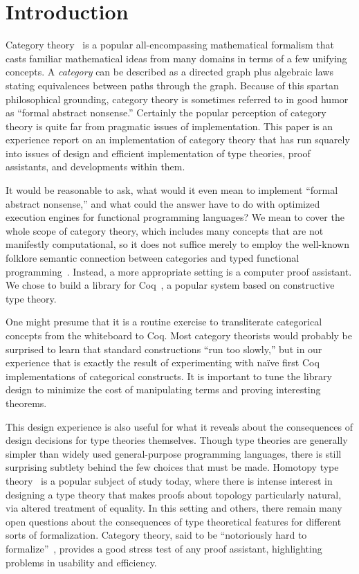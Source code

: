 \documentclass[runningheads]{llncs}
\begin{document}
\section{Introduction}

Category theory~\cite{mac1998categories} is a popular all-encompassing mathematical formalism that casts familiar mathematical ideas from many domains in terms of a few unifying concepts.  A \emph{category} can be described as a directed graph plus algebraic laws stating equivalences between paths through the graph.  Because of this spartan philosophical grounding, category theory is sometimes referred to in good humor as ``formal abstract nonsense.''  Certainly the popular perception of category theory is quite far from pragmatic issues of implementation.  This paper is an experience report on an implementation of category theory that has run squarely into issues of design and efficient implementation of type theories, proof assistants, and developments within them.

It would be reasonable to ask, what would it even mean to implement ``formal abstract nonsense,'' and what could the answer have to do with optimized execution engines for functional programming languages?  We mean to cover the whole scope of category theory, which includes many concepts that are not manifestly computational, so it does not suffice merely to employ the well-known folklore semantic connection between categories and typed functional programming~\cite{pierce1988taste}.  Instead, a more appropriate setting is a computer proof assistant.  We chose to build a library for Coq~\cite{coq}, a popular system based on constructive type theory.

One might presume that it is a routine exercise to transliterate categorical concepts from the whiteboard to Coq.  Most category theorists would probably be surprised to learn that standard constructions ``run too slowly,'' but in our experience that is exactly the result of experimenting with na\"ive first Coq implementations of categorical constructs.  It is important to tune the library design to minimize the cost of manipulating terms and proving interesting theorems.

This design experience is also useful for what it reveals about the consequences of design decisions for type theories themselves.  Though type theories are generally simpler than widely used general-purpose programming languages, there is still surprising subtlety behind the few choices that must be made.  Homotopy type theory~\cite{HoTTBook} is a popular subject of study today, where there is intense interest in designing a type theory that makes proofs about topology particularly natural, via altered treatment of equality.  In this setting and others, there remain many open questions about the consequences of type theoretical features for different sorts of formalization.  Category theory, said to be ``notoriously hard to formalize''~\cite{harrison1996formalized}, provides a good stress test of any proof assistant, highlighting problems in usability and efficiency.
\end{document}
